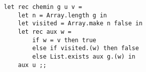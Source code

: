 \documentclass[varwidth = 20cm]{standalone}
\begin{document}
\begin{verbatim}
    let rec chemin g u v =
        let n = Array.length g in
        let visited = Array.make n false in
        let rec aux w =
            if w = v then true
            else if visited.(w) then false
            else List.exists aux g.(w) in
        aux u ;;
\end{verbatim}
\end{document}
